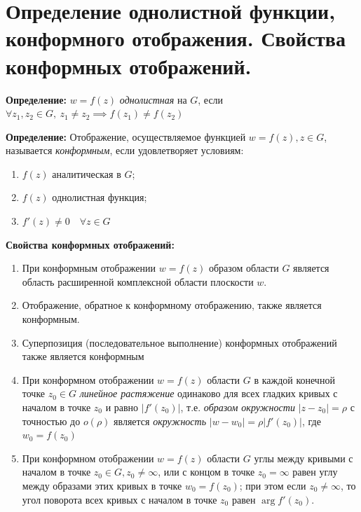 \section{Определение однолистной функции, конформного отображения.
Свойства конформных
отображений.}\label{ux43eux43fux440ux435ux434ux435ux43bux435ux43dux438ux435-ux43eux434ux43dux43eux43bux438ux441ux442ux43dux43eux439-ux444ux443ux43dux43aux446ux438ux438-ux43aux43eux43dux444ux43eux440ux43cux43dux43eux433ux43e-ux43eux442ux43eux431ux440ux430ux436ux435ux43dux438ux44f.-ux441ux432ux43eux439ux441ux442ux432ux430-ux43aux43eux43dux444ux43eux440ux43cux43dux44bux445-ux43eux442ux43eux431ux440ux430ux436ux435ux43dux438ux439.}

\textbf{Определение:} \(w=f(z)\) \emph{однолистная} на \(G\), если
\(\forall z_{1},z_{2}\in G, \ z_{1}\neq z_{2}\implies f(z_{1})\neq f(z_{2})\)

\textbf{Определение:} Отображение, осуществляемое функцией
\(w=f(z), z\in G\), называется \emph{конформным}, если удовлетворяет
условиям:

\begin{enumerate}
\def\labelenumi{\arabic{enumi}.}
\tightlist
\item
  \(f(z)\) аналитическая в \(G\);
\item
  \(f(z)\) однолистная функция;
\item
  \(f'(z)\neq 0\quad\forall z\in G\)
\end{enumerate}

\textbf{Свойства конформных отображений:}

\begin{enumerate}
\def\labelenumi{\arabic{enumi}.}
\tightlist
\item
  При конформным отображении \(w=f(z)\) образом области \(G\) является
  область расширенной комплексной области плоскости \(w\).
\item
  Отображение, обратное к конформному отображению, также является
  конформным.
\item
  Суперпозиция (последовательное выполнение) конформных отображений
  также является конформным
\item
  При конформном отображении \(w=f(z)\) области \(G\) в каждой конечной
  точке \(z_{0}\in G\) \emph{линейное растяжение} одинаково для всех
  гладких кривых с началом в точке \(z_{0}\) и равно \(|f'(z_{0})|\),
  т.е. \emph{образом окружности} \(|z-z_{0}|=\rho\) с точностью до
  \(o(\rho)\) является \emph{окружность} \(|w-w_{0}|=\rho |f'(z_{0})|\),
  где \(w_{0}=f(z_{0})\)
\item
  При конформном отображении \(w=f(z)\) области \(G\) углы между кривыми
  с началом в точке \(z_{0}\in G, z_{0}\neq \infty\), или с концом в
  точке \(z_{0}=\infty\) равен углу между образами этих кривых в точке
  \(w_{0}=f(z_{0})\); при этом если \(z_{0}\neq \infty\), то угол
  поворота всех кривых с началом в точке \(z_{0}\) равен
  \(\arg f'(z_{0})\).
\end{enumerate}
